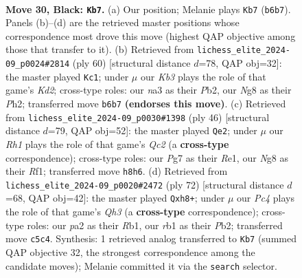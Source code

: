 \documentclass[11pt]{article}
\begin{document}
\clearpage

\begin{figure}[p]\centering
\begin{subfigure}{0.46\textwidth}\centering
\resizebox{\linewidth}{!}{%
\newchessgame
\chessboard[
  setfen={4Q1nr/2r3p1/1k6/2p3Pp/5P1q/N1P5/PP4K1/1RB5 b - - 3 30},
  showmover=false,
  pgfstyle=straightmove, color=movearrow, markmove={b6-b7}
]}
\caption{}
\end{subfigure}\hfill
\begin{subfigure}{0.46\textwidth}\centering
\resizebox{\linewidth}{!}{%
\newchessgame
\chessboard[
  setfen={5rk1/1p4bp/1N1p4/1R1Pn3/6pq/3B1p2/1P1K3P/3Q3R w - - 0 31},
  showmover=false,
  pgfstyle=straightmove, color=movearrow, markmove={d2-c1}
]}
\caption{}
\end{subfigure}
\\[4pt]
\begin{subfigure}{0.46\textwidth}\centering
\resizebox{\linewidth}{!}{%
\newchessgame
\chessboard[
  setfen={r2r3k/p5pp/1p6/1Pb5/2q2B2/2P5/2Q3PP/4RR1K w - - 1 24},
  showmover=false,
  pgfstyle=straightmove, color=movearrow, markmove={c2-e2}
]}
\caption{}
\end{subfigure}\hfill
\begin{subfigure}{0.46\textwidth}\centering
\resizebox{\linewidth}{!}{%
\newchessgame
\chessboard[
  setfen={1r3k1b/2p5/6q1/1r1pp1P1/4Np2/1P2nP1Q/1P6/1RK5 w - - 0 37},
  showmover=false,
  pgfstyle=straightmove, color=movearrow, markmove={h3-h8}
]}
\caption{}
\end{subfigure}
\caption{\textbf{Move 30, Black: \texttt{Kb7}.} (a) Our position; Melanie plays \texttt{Kb7} (\texttt{b6b7}). Panels (b)--(d) are the retrieved master positions whose correspondence most drove this move (highest QAP objective among those that transfer to it). (b) Retrieved from \texttt{lichess\_elite\_2024-09\_p0024\#2814} (ply 60) [structural distance $d$=78, QAP obj=32]: the master played \texttt{Kc1}; under $\mu$ our \emph{Kb3} plays the role of that game's \emph{Kd2}; cross-type roles: our \emph{n}a3 as their \emph{P}b2, our \emph{N}g8 as their \emph{P}h2; transferred move \texttt{b6b7} \textbf{(endorses this move)}. (c) Retrieved from \texttt{lichess\_elite\_2024-09\_p0030\#1398} (ply 46) [structural distance $d$=79, QAP obj=52]: the master played \texttt{Qe2}; under $\mu$ our \emph{Rh1} plays the role of that game's \emph{Qc2} (a \textbf{cross-type} correspondence); cross-type roles: our \emph{P}g7 as their \emph{R}e1, our \emph{N}g8 as their \emph{R}f1; transferred move \texttt{h8h6}. (d) Retrieved from \texttt{lichess\_elite\_2024-09\_p0020\#2472} (ply 72) [structural distance $d$=68, QAP obj=42]: the master played \texttt{Qxh8+}; under $\mu$ our \emph{Pc4} plays the role of that game's \emph{Qh3} (a \textbf{cross-type} correspondence); cross-type roles: our \emph{p}a2 as their \emph{R}b1, our \emph{r}b1 as their \emph{P}b2; transferred move \texttt{c5c4}. Synthesis: 1 retrieved analog transferred to \texttt{Kb7} (summed QAP objective 32, the strongest correspondence among the candidate moves); Melanie committed it via the \texttt{search} selector.}
\label{fig:thought-m59}
\end{figure}
\end{document}
